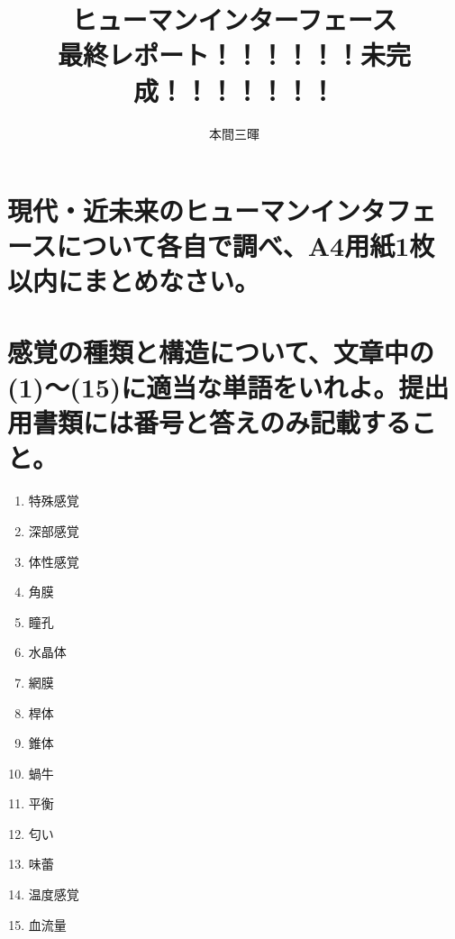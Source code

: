 \documentclass[titlepage,a4paper]{jsarticle}
\title{ヒューマンインターフェース\\最終レポート！！！！！！未完成！！！！！！！}
\author{本間三暉}
\begin{document}
\maketitle
\section{現代・近未来のヒューマンインタフェースについて各自で調べ、A4用紙1枚 以内にまとめなさい。}%

\section{感覚の種類と構造について、文章中の(1)〜(15)に適当な単語をいれよ。提出用書類には番号と答えのみ記載すること。}%
\begin{enumerate}
  \item 特殊感覚
  \item 深部感覚
  \item 体性感覚
  \item 角膜
  \item 瞳孔
  \item 水晶体
  \item 網膜
  \item 桿体
  \item 錐体
  \item 蝸牛
  \item 平衡
  \item 匂い
  \item 味蕾
  \item 温度感覚
  \item 血流量
\end{enumerate}
\end{document}
